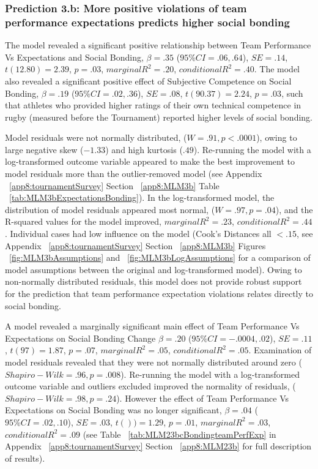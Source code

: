 \begin{CJK}{UTF8}{gbsn}
\subsubsection{Prediction 3.b: More positive violations of team performance expectations predicts higher social bonding}
The model revealed a significant positive relationship between Team Performance Vs Expectations and Social Bonding, $\beta = .35$ ($95\% CI = .06, .64$), $SE = .14$, $t(12.80) = 2.39$, $p = .03$, $marginal R^2 = .20$, $conditional R^2 = .40$.  The model also revealed a significant positive effect of Subjective Competence on Social Bonding, $\beta = .19$ ($95\% CI =  .02, .36$), $SE = .08$, $t(90.37) = 2.24$, $p = .03$, such that athletes who provided higher ratings of their own technical competence in rugby (measured before the Tournament) reported higher levels of social bonding.

Model residuals were not normally distributed, ($W = .91, p < .0001$), owing to large negative skew ($-1.33$) and high kurtosis ($.49$). Re-running the model with a log-transformed outcome variable appeared to make the best improvement to model residuals more than the outlier-removed model (see Appendix ~\ref{app8:tournamentSurvey} Section ~\ref{app8:MLM3b} Table ~\ref{tab:MLM3bExpectationsBonding}). In the log-transformed model, the distribution of model residuals appeared most normal,  ($W = .97, p = .04$), and the R-squared values for the model improved, $marginal R^2 = .23$, $conditional R^2 = .44$.
Individual cases had low influence on the model (Cook's Distances all $< .15$, see Appendix ~\ref{app8:tournamentSurvey} Section ~\ref{app8:MLM3b} Figures ~\ref{fig:MLM3bAssumptions} and ~\ref{fig:MLM3bLogAssumptions} for a comparison of model assumptions between the original and log-transformed model).
Owing to non-normally distributed residuals, this model does not provide robust support for the prediction that team performance expectation violations relates directly to social bonding.



  A model revealed a marginally significant main effect of Team Performance Vs Expectations on Social Bonding Change $\beta = .20$ ($95\% CI =  -.0004, .02$), $SE = .11$, $t(97) = 1.87$, $p = .07$, $marginal R^2 = .05$, $conditional R^2 = .05$.  Examination of model residuals revealed that they were not normally distributed around zero ($Shapiro-Wilk = .96, p = .008$).  Re-running the model with a log-transformed outcome variable and outliers excluded improved the normality of residuals, ($Shapiro-Wilk = .98, p = .24$).
  However the effect of Team Performance Vs Expectations on Social Bonding was no longer significant, $\beta = .04$ ($95\% CI =  .02, .10$), $SE = .03$, $t()) = 1.29$, $p = .01$, $marginal R^2 = .03$, $conditional R^2 = .09$ (see Table ~\ref{tab:MLM23bcBondingteamPerfExp} in Appendix ~\ref{app8:tournamentSurvey} Section ~\ref{app8:MLM23b} for full description of results).


\end{CJK}
